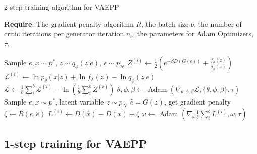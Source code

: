 \begin{algorithm}[tb]
\caption{2-step training algorithm for VAEPP}
\label{alg:vaepp}
\textbf{Require}: The gradient penalty algorithm $R$, the batch size $b$, the number of critic iterations per generator iteration $n_c$, the parameters for Adam Optimizers, $\tau$. 

\begin{algorithmic}[1] %
\STATE Sample $e, x \sim p^*$, $z \sim q_\phi(z|e)$, $\epsilon \sim p_\mathcal{N}$
\STATE $Z^{(i)} \gets \frac{1}{2}(e^{-\beta D(G(\epsilon))} + \frac{f_\lambda(z)}{\hat{q}_\phi(z)})$
\STATE $\mathcal{L}^{(i)} \gets \ln p_\theta(x|z) + \ln f_\lambda(z) - \ln q_\phi(z|e)$
\ENDFOR
\STATE $\mathcal{L} \gets \frac{1}{b}\sum_{i}^b \mathcal{L}^{(i)} - \ln (\frac{1}{b}\sum_{i}^b Z^{(i)})$
\STATE $\theta, \phi, \beta \gets $ Adam $(\nabla_{\theta, \phi, \beta} \mathcal{L}, \{\theta, \phi, \beta\}, \tau)$
\ENDFOR
{}
\STATE Sample $e, x \sim p^*$, latent variable $z \sim p_\mathcal{N}$
\STATE	$\hat{e} = G(z)$, get gradient penalty $\zeta \gets R(e, \hat{e})$
\STATE $L^{(i)} \gets D(\hat{x}) - D(x) + \zeta$
\ENDFOR
\STATE $\omega \gets $ Adam $(\nabla_{\omega} \frac{1}{b}\sum_{i}^b L^{(i)}, \omega, \tau)$
\ENDWHILE
\end{algorithmic}
\end{algorithm}

\subsection{1-step training for VAEPP} \label{subsec:improve_of_vaepp}

